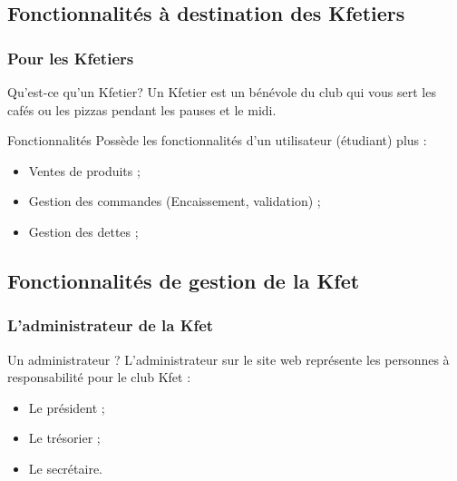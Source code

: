 \documentclass{polytech-presentation}
\newcommand{\beamerannot}[1]{
    \note{#1}
}
\begin{document}
            \subsection<presentation>{Fonctionnalités à destination des Kfetiers}%
                \begin{frame}
		  \frametitle{Pour les Kfetiers}
		    \begin{block}{Qu'est-ce qu'un Kfetier?}
		     Un Kfetier est un bénévole du club qui vous sert les cafés ou les pizzas pendant les pauses et le
midi.
		    \end{block}

                    \begin{block}{Fonctionnalités}
                     Possède les fonctionnalités d'un utilisateur (étudiant) plus :
		      \begin{itemize}
		       \item Ventes de produits ;
		       \item Gestion des commandes (Encaissement, validation) ;
		       \item Gestion des dettes ;
		      \end{itemize}
                    \end{block}
                    \beamerannot{}
                \end{frame}

            \subsection<presentation>{Fonctionnalités de gestion de la Kfet}%
                \begin{frame}
		  \frametitle{L'administrateur de la Kfet}
                    \begin{block}{Un administrateur ?}
		      L'administrateur sur le site web représente les personnes à responsabilité pour le club Kfet :
		      \begin{itemize}
		       \item Le président ;
		       \item Le trésorier ;
		       \item Le secrétaire.
		      \end{itemize}
                    \end{block}
                    \beamerannot{}
                \end{frame}
                
\end{document}
